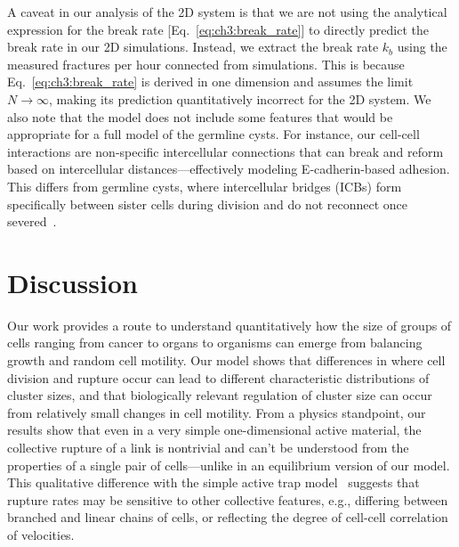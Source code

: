 A caveat in our analysis of the 2D system is that we are not using the analytical expression for the break rate [Eq.~\eqref{eq:ch3:break_rate}] to directly predict the break rate in our 2D simulations. Instead, we extract the break rate $k_b$ using the measured fractures per hour connected from simulations. This is because Eq.~\eqref{eq:ch3:break_rate} is derived in one dimension and assumes the limit $N\to\infty$, making its prediction quantitatively incorrect for the 2D system. We also note that the model does not include some features that would be appropriate for a full model of the germline cysts. For instance, our cell-cell interactions are non-specific intercellular connections that can break and reform based on intercellular distances---effectively modeling E-cadherin-based adhesion. This differs from germline cysts, where intercellular bridges (ICBs) form specifically between sister cells during division and do not reconnect once severed~\cite{ikami2023branched,levy2024tug}.


\section{Discussion}
\label{sec:ch3:discussion}

Our work provides a route to understand quantitatively how the size of groups of cells ranging from cancer to organs to organisms can emerge from balancing growth and random cell motility. Our model shows that differences in where cell division and rupture occur can lead to different characteristic distributions of cluster sizes, and that biologically relevant regulation of cluster size can occur from relatively small changes in cell motility. From a physics standpoint, our results show that even in a very simple one-dimensional active material, the collective rupture of a link is nontrivial and can't be understood from the properties of a single pair of cells---unlike in an equilibrium version of our model. This qualitative difference with the simple active trap model~\cite{woillez2020active} suggests that rupture rates may be sensitive to other collective features, e.g., differing between branched and linear chains of cells, or reflecting the degree of cell-cell correlation of velocities.

